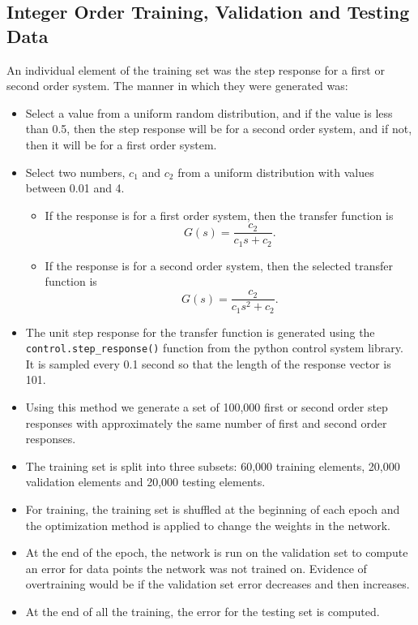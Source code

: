\documentclass[letterpaper, 10 pt, conference]{ieeeconf}  %
\begin{document}
\subsection{Integer Order Training, Validation and Testing Data}
  An individual element of the training set was the step response for a first or
  second order system. The manner in which they were generated was:

  \begin{itemize}

    \item Select a value from a uniform random distribution, and if the value is
    less than 0.5, then the step response will be for a second order system, and
    if not, then it will be for a first order system.

    \item Select two numbers, $c_1$ and $c_2$ from a uniform distribution with
    values between 0.01 and 4.

    \begin{itemize}

      \item If the response is for a first order system, then the transfer
      function is
      \[
        G(s) = \frac{c_2}{c_1 s + c_2}.
      \]

      \item If the response is for a second order system, then the selected
      transfer function is
      \[
        G(s) = \frac{c_2}{c_1 s^2 + c_2}.
      \]

    \end{itemize}

    \item The unit step response for the transfer function is generated using
    the \texttt{control.step\_response()} function from the python control system
    library. It is sampled every 0.1 second so that the length of the response
    vector is 101.

    \item Using this method we generate a set of 100,000 first or second order
    step responses with approximately the same number of first and second order
    responses.

    \item The training set is split into three subsets: 60,000 training
    elements, 20,000 validation elements and 20,000 testing elements.

    \item For training, the training set is shuffled at the beginning of each
    epoch and the optimization method is applied to change the weights in the
    network.

    \item At the end of the epoch, the network is run on the validation set to
    compute an error for data points the network was not trained on. Evidence of
    overtraining would be if the validation set error decreases and then
    increases.

    \item At the end of all the training, the error for the testing set is
    computed.

  \end{itemize}
\end{document}
